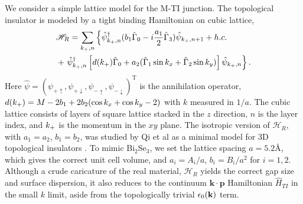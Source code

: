 We consider a simple lattice model for the M-TI junction.
The topological insulator is modeled by 
a tight binding Hamiltonian on cubic lattice,
\begin{eqnarray*}
&\mathscr{H}_R=\sum_{k_{+},n}\left\{ 
\hat{\psi}_{k_{+},n}^\dagger (b_1\hat{\Gamma}_0-i\frac{a_1}{2}\hat{\Gamma}_3)  \hat{\psi}_{k_{+},n+1}+ h.c. \right. \\
&+\left. 
\hat{\psi}_{k_{+},n}^\dagger\left[d(k_{+})\hat{\Gamma}_0+a_2(\hat{\Gamma}_1\sin k_x +\hat{\Gamma}_2\sin k_y)\right] \hat{\psi}_{k_{+},n} \right\} .
\end{eqnarray*}
Here $\hat{\psi}=(\psi_{+\uparrow},\psi_{+\downarrow},\psi_{-\uparrow},\psi_{-\downarrow})^\mathrm{T}$ is the annihilation operator, $d(k_{+})=M-2b_1+2b_2(\cos k_x+\cos k_y-2)$ with $k$ measured in $1/a$. 
The cubic lattice consists of layers of square lattice stacked in the $z$ direction,
$n$ is the layer index, and $k_{+}$ is the momentum in the $xy$ plane.
The isotropic version of $\mathscr{H}_R$, with $a_1=a_2$, $b_1=b_2$, was 
studied by Qi et al as a minimal model for 3D topological insulators \cite{qi_field}.
To mimic Bi$_2$Se$_3$, we set the lattice spacing $a=5.2$\AA, which gives the correct unit cell volume, 
and $a_i=A_i/a$, $b_i=B_i/a^2$ for $i=1,2$. Although a crude caricature 
of the real material, $\mathscr{H}_R$ yields the correct gap size and surface dispersion, it also reduces to 
the continuum  $\mathbf{k\cdot p}$ Hamiltonian $\hat{H}_{TI}$ in the small $k$ limit, 
aside from the topologically trivial $\epsilon_0(\mathbf{k})$ term.
 
